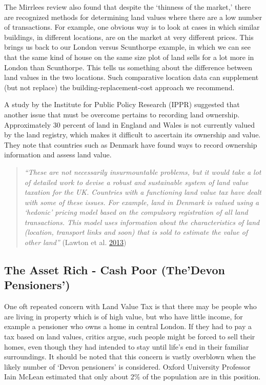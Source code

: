 \documentclass[]{tufte-handout}
\begin{document}
The Mirrlees review also found that despite the `thinness of the
market,' there are recognized methods for determining land values where
there are a low number of transactions. For example, one obvious way is
to look at cases in which similar buildings, in different locations, are
on the market at very different prices. This brings us back to our
London versus Scunthorpe example, in which we can see that the same kind
of house on the same size plot of land sells for a lot more in London
than Scunthorpe. This tells us something about the difference between
land values in the two locations. Such comparative location data can
supplement (but not replace) the building-replacement-cost approach we
recommend.

A study by the Institute for Public Policy Research (IPPR) suggested
that another issue that must be overcome pertains to recording land
ownership. Approximately 30 percent of land in England and Wales is not
currently valued by the land registry, which makes it difficult to
ascertain its ownership and value. They note that countries such as
Denmark have found ways to record ownership information and assess land
value.

\begin{quote}
\emph{``These are not necessarily insurmountable problems, but it would
take a lot of detailed work to devise a robust and sustainable system of
land value taxation for the UK. Countries with a functioning land value
tax have dealt with some of these issues. For example, land in Denmark
is valued using a `hedonic' pricing model based on the compulsory
registration of all land transactions. This model uses information about
the characteristics of land (location, transport links and soon) that is
sold to estimate the value of other land''} (Lawton et al.
\protect\hyperlink{ref-Lawton2013a}{2013})
\end{quote}

\hypertarget{the-asset-rich---cash-poor-thedevon-pensioners}{%
\subsection{The Asset Rich - Cash Poor (The'Devon
Pensioners')}\label{the-asset-rich---cash-poor-thedevon-pensioners}}

One oft repeated concern with Land Value Tax is that there may be people
who are living in property which is of high value, but who have little
income, for example a pensioner who owns a home in central London. If
they had to pay a tax based on land values, critics argue, such people
might be forced to sell their homes, even though they had intended to
stay until life's end in their familiar surroundings. It should be noted
that this concern is vastly overblown when the likely number of `Devon
pensioners' is considered. Oxford University Professor Iain McLean
estimated that only about 2\% of the population are in this position.
\end{document}
